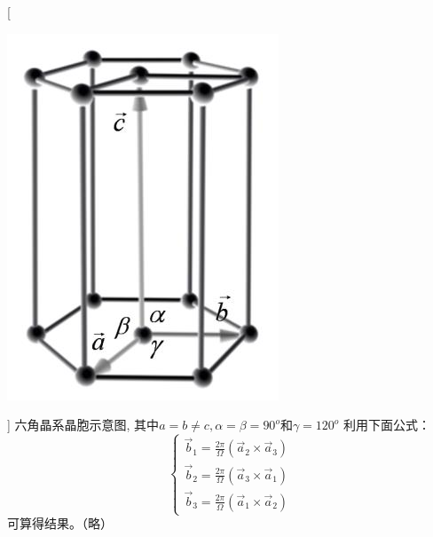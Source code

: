 \documentclass[UTF8,12pt, a4paper, oneside]{ctexart}
\begin{document}
        [\begin{center}
            \includegraphics{picture/3-5.png}
        \end{center}]
       {六角晶系晶胞示意图, 其中$a=b\ne c ,\alpha=\beta=90^o$和$\gamma=120^o$
        利用下面公式：\[\left\{\begin{array}{l}
            \vec{b}_{1}=\frac{2 \pi}{\Omega}\left(\vec{a}_{2} \times \vec{a}_{3}\right) \\
            \vec{b}_{2}=\frac{2 \pi}{\Omega}\left(\vec{a}_{3} \times \vec{a}_{1}\right)  \\
            \vec{b}_{3}=\frac{2 \pi}{\Omega}\left(\vec{a}_{1} \times \vec{a}_{2}\right)
            \end{array}\right.\]可算得结果。（略）}
\end{document}
